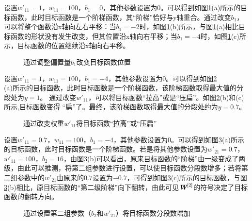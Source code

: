 \parinterval 设置$ w'_{11}=1 $，$ w_{11}=100 $，$ b_1=0 $，其他参数设置为0。可以得到如图\ref{fig:9-20}(a)所示的目标函数，此时目标函数是一个阶梯函数，其“阶梯”恰好与y轴重合。通过改变$ b_1 $，可以将整个函数沿x轴向左右平移：当$ b_1=-2 $时，如图\ref{fig:9-20}(b)所示，与图\ref{fig:9-20}(a)相比目标函数的形状没有发生改变，但其位置沿x轴向右平移；当$ b_1=-4 $时，如图\ref{fig:9-20}(c)所示，目标函数的位置继续沿x轴向右平移。

\begin{figure}[htp]
\centering

\caption{通过调整偏置量$ b_1 $改变目标函数位置}
\label{fig:9-20}
\end {figure}

\parinterval 设置$ w'_{11}=1 $，$ w_{11}=100 $，$ b_1=-4 $，其他参数设置为0。可以得到如图\ref{fig:9-21}\\(a)所示的目标函数，此时目标函数是一个阶梯函数，该阶梯函数取得最大值的分段处为$ y=1 $。 通过改变$ w'_{11} $，可以将目标函数“拉高”或是“压扁”。如图\ref{fig:9-21}(b)和(c)所示,目标函数变得 “扁”了。最终，该阶梯函数取得最大值的分段处约为$ y=0.7 $。

\begin{figure}[htp]
\centering

\caption{通过改变权重$ w'_{11} $将目标函数“拉高”或“压扁”}
\label{fig:9-21}
\end {figure}

\parinterval 设置$ w'_{11}=0.7 $，$ w_{11}=100 $，$ b_1=-4 $，其他参数设置为0。可以得到如图\ref{fig:9-22}(a)所示的目标函数，此时目标函数是一个阶梯函数。若是将其他参数设置为$ w'_{21}=0.7 $，$ w'_{11}=100 $，$ b_2=16 $，由图\ref{fig:9-22}(b)可以看出，原来目标函数的“阶梯”由一级变成了两级，由此可以推测，将第二组参数进行设置，可以使目标函数分段数增多；若将第二组参数中的$ w'_{21} $由原来的$ 0.7 $设置为$ -0.7 $，可得到如图\ref{fig:9-22}(c)所示的目标函数，与图\ref{fig:9-22}(b)相比，原目标函数的“第二级阶梯”向下翻转，由此可见${\textbf{\em W}}^{[2]}$的符号决定了目标函数的翻转方向。

\begin{figure}[htp]
\centering

\caption{通过设置第二组参数（$b_2$和$w'_{21}$）将目标函数分段数增加}
\label{fig:9-22}
\end {figure}

